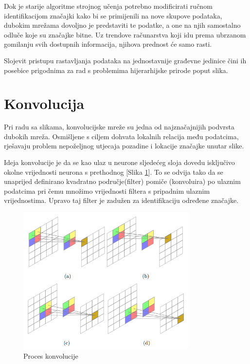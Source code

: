 \documentclass[lmodern, utf8, seminar]{fer}
\begin{document}
Dok je starije algoritme strojnog učenja potrebno modificirati ručnom identifikacijom značajki kako bi se primijenili na nove skupove podataka, dubokim mrežama dovoljno je predstaviti te podatke, a one na njih samostalno odluče koje su značajke bitne. Uz trendove računarstva koji idu prema ubrzanom gomilanju svih dostupnih informacija, njihova prednost će samo rasti.

Slojevit pristupu rastavljanja podataka na jednostavnije građevne jedinice čini ih posebice prigodnima za rad s problemima hijerarhijske prirode poput slika. 
\newline

\section{Konvolucija}
Pri radu sa slikama, konvolucijske mreže su jedna od najznačajnijih podvrsta dubokih mreža. Osmišljene s ciljem dohvata lokalnih relacija među podatcima, rješavaju problem nepoželjnog utjecaja pozadine i lokacije značajke unutar slike. 

Ideja konvolucije je da se kao ulaz u neurone sljedećeg sloja dovedu isključivo okolne vrijednosti neurona s prethodnog [Slika \ref{fig:convolution}]. To se odvija tako da se unaprijed definirano kvadratno područje(filter) pomiče (konvoluira) po ulaznim podatcima pri čemu množimo vrijednosti filtera s pripadnim ulaznim vrijednostima. Upravo taj filter je zadužen za identifikaciju određene značajke.
\newline

\begin{figure}[H]
    \centering
    \includegraphics[width=0.8\textwidth]{convolution}
    \caption{Proces konvolucije}
    \label{fig:convolution}
\end{figure}
\end{document}
